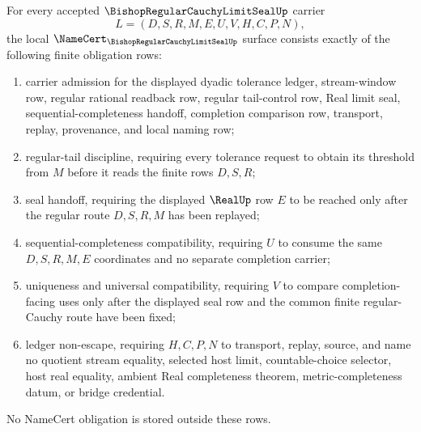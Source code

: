 \begin{theorem}
\label{thm:bishop-regular-cauchy-limit-seal-namecert-obligations}
For every accepted $\BishopRegularCauchyLimitSealUp$ carrier
$$
L=(D,S,R,M,E,U,V,H,C,P,N),
$$
the local $\NameCert_{\BishopRegularCauchyLimitSealUp}$ surface consists exactly of the following finite obligation rows:
\begin{enumerate}
\item carrier admission for the displayed dyadic tolerance ledger, stream-window row, regular rational readback row, regular tail-control row, Real limit seal, sequential-completeness handoff, completion comparison row, transport, replay, provenance, and local naming row;
\item regular-tail discipline, requiring every tolerance request to obtain its threshold from $M$ before it reads the finite rows $D,S,R$;
\item seal handoff, requiring the displayed $\RealUp$ row $E$ to be reached only after the regular route $D,S,R,M$ has been replayed;
\item sequential-completeness compatibility, requiring $U$ to consume the same $D,S,R,M,E$ coordinates and no separate completion carrier;
\item uniqueness and universal compatibility, requiring $V$ to compare completion-facing uses only after the displayed seal row and the common finite regular-Cauchy route have been fixed;
\item ledger non-escape, requiring $H,C,P,N$ to transport, replay, source, and name no quotient stream equality, selected host limit, countable-choice selector, host real equality, ambient Real completeness theorem, metric-completeness datum, or bridge credential.
\end{enumerate}
No NameCert obligation is stored outside these rows.
\end{theorem}
